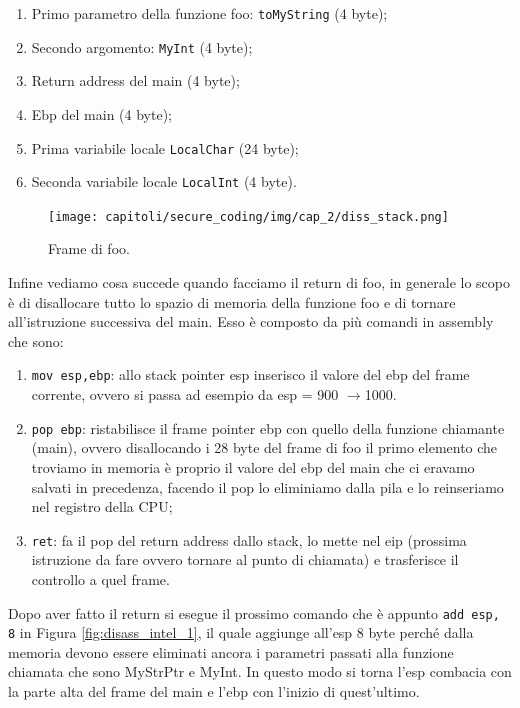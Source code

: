 \begin{enumerate}
    \item Primo parametro della funzione foo: \verb|toMyString| (4 byte);
    \item Secondo argomento: \verb|MyInt| (4 byte);
    \item Return address del main (4 byte);
    \item Ebp del main (4 byte);
    \item Prima variabile locale \verb|LocalChar| (24 byte);
    \item Seconda variabile locale \verb|LocalInt|  (4 byte).
\end{enumerate}

\begin{figure}[H]
    \centering
    \texttt{[image: capitoli/secure\_coding/img/cap\_2/diss\_stack.png]}
    \caption{Frame di foo.}\label{fig:frame_foo}
\end{figure}

Infine vediamo cosa succede quando facciamo il return di foo, in generale lo scopo
è di disallocare tutto lo spazio di memoria della funzione foo e di tornare
all'istruzione successiva del main. Esso è composto da più comandi in assembly che sono:

\begin{enumerate}
    \item \verb|mov esp,ebp|: allo stack pointer esp inserisco il valore del ebp del
          frame corrente, ovvero si passa ad esempio da esp = 900 $\rightarrow$1000.
    \item \verb|pop ebp|: ristabilisce il frame pointer ebp con quello della funzione
          chiamante (main), ovvero disallocando i 28 byte del frame di foo il primo
          elemento che troviamo in memoria è proprio il valore del ebp del main che ci
          eravamo salvati in precedenza, facendo il pop lo eliminiamo dalla pila e lo
          reinseriamo nel registro della CPU;
    \item \verb|ret|: fa il pop del return address dallo stack, lo mette nel
          eip (prossima istruzione da fare ovvero tornare al punto di chiamata) e
          trasferisce il controllo a quel frame.
\end{enumerate}

Dopo aver fatto il return si esegue il prossimo comando che è appunto \verb|add esp, 8|
in Figura \ref{fig:disass_intel_1}, il quale aggiunge all'esp 8 byte perché dalla
memoria devono essere eliminati ancora i parametri passati alla funzione chiamata
che sono MyStrPtr e MyInt. In questo modo si torna l'esp combacia con la parte alta
del frame del main e l'ebp con l'inizio di quest'ultimo.


